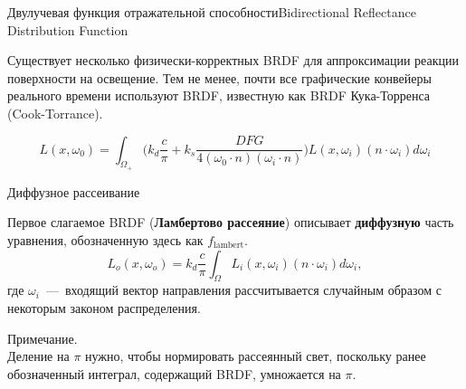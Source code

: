 \documentclass{beamer}
\begin{document}
	\begin{frame}{Двулучевая функция отражательной способности}{Bidirectional Reflectance Distribution Function}


		Существует несколько физически-корректных BRDF для аппроксимации реакции поверхности на освещение. Тем не менее, почти все графические конвейеры реального времени используют BRDF, известную как BRDF Кука-Торренса (Cook-Torrance).

		\[
			L (x, \omega_0) =
			\int_{\Omega_+} \bigg( 
			k_d \frac{c}{\pi} 
			+
			k_s \frac{DFG}{4 (\omega_0 \cdot n) (\omega_i \cdot n)} 
			\bigg)
			L (x,\omega_i) (n \cdot \omega_i)
			d \omega_i
		\]


	\end{frame}

	\begin{frame}{Диффузное рассеивание}

		Первое слагаемое BRDF (\textbf{Ламбертово рассеяние}) описывает \textbf{диффузную} часть уравнения, обозначенную здесь как $f_{\text{lambert}}$.
		\[
				L_o(x,\omega_o) = k_d \frac{c}{\pi}
				\int_{\Omega}
				L_i(x, \omega_i) (n \cdot \omega_i) d \omega_i
			,
			\]
			где 
			$\omega_i$~---~входящий вектор направления рассчитывается случайным образом с некоторым законом распределения.

			\vspace{2mm}
			Примечание. \\
			Деление на $\pi$ нужно, чтобы нормировать рассеянный свет, поскольку ранее обозначенный интеграл, содержащий BRDF, умножается на $\pi$.

	\end{frame}
\end{document}
